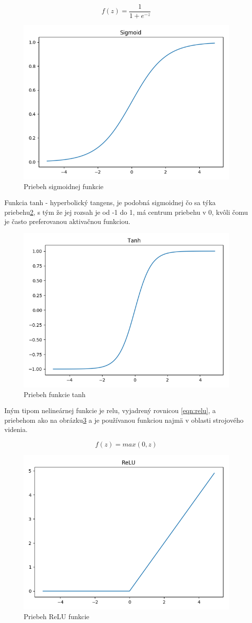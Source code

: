 \begin{equation}\label{eqn:sigmoid}
f(z) = \frac{1}{1 + e^{-z}}
\end{equation}

\begin{figure}[H]
	\centering
	\includegraphics[width=0.5\linewidth]{img/sigmoid}
	\caption{Priebeh sigmoidnej funkcie}
	\label{fig:sigmoid}
\end{figure}

Funkcia tanh - hyperbolický tangens, je podobná sigmoidnej čo sa týka priebehu\ref{fig:tanh}, s tým že jej rozsah je od -1 do 1, má centrum priebehu v 0, kvôli čomu je často preferovanou aktivačnou funkciou.

\begin{figure}[H]
	\centering
	\includegraphics[width=0.5\linewidth]{img/tanh}
	\caption{Priebeh funkcie tanh}
	\label{fig:tanh}
\end{figure}

Iným tipom nelineárnej funkcie je \acrshort{relu}, vyjadrený rovnicou \eqref{eqn:relu}, a priebehom ako na obrázku\ref{fig:relu} a je používanou funkciou najmä v oblasti strojového videnia.

\begin{equation}\label{eqn:relu}
f(z) = max(0, z)
\end{equation}

\begin{figure}[H]
	\centering
	\includegraphics[width=0.5\linewidth]{img/relu}
	\caption{Priebeh ReLU funkcie}
	\label{fig:relu}
\end{figure}

